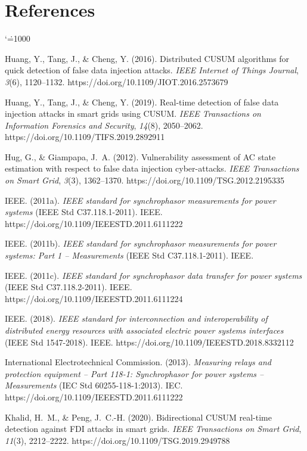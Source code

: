 \documentclass[11pt,a4paper]{report}
\makeatletter
\renewcommand{\bibname}{References}
\renewenvironment{thebibliography}[1]{%
  \chapter*{\bibname}%
  \addcontentsline{toc}{chapter}{\bibname}%
  \list{}{%
    \setlength{\labelwidth}{0pt}%
    \setlength{\labelsep}{0pt}%
    \setlength{\leftmargin}{0.35in}%
    \setlength{\itemindent}{-0.35in}%
    \setlength{\itemsep}{6pt}%
    \setlength{\parsep}{0pt}%
    \usecounter{enumiv}%
    \let\p@enumiv\@empty
    \renewcommand\theenumiv{\@arabic\c@enumiv}%
  }%
  \sloppy\clubpenalty4000\widowpenalty4000%
  \sfcode`\.=1000\relax
}{%
  \endlist
}
\makeatother
\begin{document}
\begin{thebibliography}{99}
Huang, Y., Tang, J., \& Cheng, Y. (2016). Distributed CUSUM algorithms for quick detection of false data injection attacks. \textit{IEEE Internet of Things Journal}, \textit{3}(6), 1120--1132. https://doi.org/10.1109/JIOT.2016.2573679

Huang, Y., Tang, J., \& Cheng, Y. (2019). Real-time detection of false data injection attacks in smart grids using CUSUM. \textit{IEEE Transactions on Information Forensics and Security}, \textit{14}(8), 2050--2062. https://doi.org/10.1109/TIFS.2019.2892911

Hug, G., \& Giampapa, J.~A. (2012). Vulnerability assessment of AC state estimation with respect to false data injection cyber-attacks. \textit{IEEE Transactions on Smart Grid}, \textit{3}(3), 1362--1370. https://doi.org/10.1109/TSG.2012.2195335

IEEE. (2011a). \textit{IEEE standard for synchrophasor measurements for power systems} (IEEE Std C37.118.1-2011). IEEE. https://doi.org/10.1109/IEEESTD.2011.6111222

IEEE. (2011b). \textit{IEEE standard for synchrophasor measurements for power systems: Part 1 -- Measurements} (IEEE Std C37.118.1-2011). IEEE.

IEEE. (2011c). \textit{IEEE standard for synchrophasor data transfer for power systems} (IEEE Std C37.118.2-2011). IEEE. https://doi.org/10.1109/IEEESTD.2011.6111224

IEEE. (2018). \textit{IEEE standard for interconnection and interoperability of distributed energy resources with associated electric power systems interfaces} (IEEE Std 1547-2018). IEEE. https://doi.org/10.1109/IEEESTD.2018.8332112

International Electrotechnical Commission. (2013). \textit{Measuring relays and protection equipment -- Part 118-1: Synchrophasor for power systems -- Measurements} (IEC Std 60255-118-1:2013). IEC. https://doi.org/10.1109/IEEESTD.2011.6111222

Khalid, H.~M., \& Peng, J.~C.-H. (2020). Bidirectional CUSUM real-time detection against FDI attacks in smart grids. \textit{IEEE Transactions on Smart Grid}, \textit{11}(3), 2212--2222. https://doi.org/10.1109/TSG.2019.2949788


\end{thebibliography}
\end{document}

